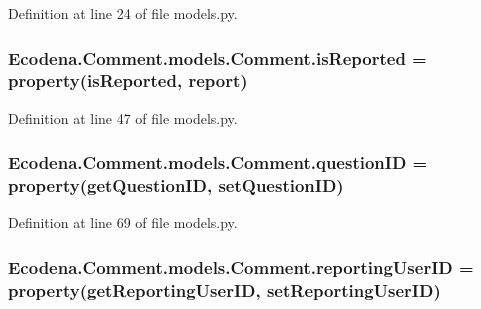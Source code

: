 Definition at line 24 of file models.py.

\hypertarget{class_ecodena_1_1_comment_1_1models_1_1_comment_a420b2edee7b202c70359f71dfed3c353}{
\subsubsection[{isReported}]{\setlength{\rightskip}{0pt plus 5cm}Ecodena.Comment.models.Comment.isReported = property(isReported, report)}}
\label{d9/d86/class_ecodena_1_1_comment_1_1models_1_1_comment_a420b2edee7b202c70359f71dfed3c353}


Definition at line 47 of file models.py.

\hypertarget{class_ecodena_1_1_comment_1_1models_1_1_comment_ada022b7888e08bd7dc6f819260a73e57}{
\subsubsection[{questionID}]{\setlength{\rightskip}{0pt plus 5cm}Ecodena.Comment.models.Comment.questionID = property(getQuestionID, setQuestionID)}}
\label{d9/d86/class_ecodena_1_1_comment_1_1models_1_1_comment_ada022b7888e08bd7dc6f819260a73e57}


Definition at line 69 of file models.py.

\hypertarget{class_ecodena_1_1_comment_1_1models_1_1_comment_ad5f4e6f39bbbc54a135d3b6c29c0a2a2}{
\subsubsection[{reportingUserID}]{\setlength{\rightskip}{0pt plus 5cm}Ecodena.Comment.models.Comment.reportingUserID = property(getReportingUserID, setReportingUserID)}}
\label{d9/d86/class_ecodena_1_1_comment_1_1models_1_1_comment_ad5f4e6f39bbbc54a135d3b6c29c0a2a2}


